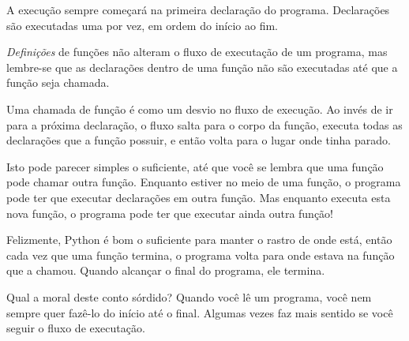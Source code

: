 A execução sempre começará na primeira declaração do programa.
Declarações são executadas uma por vez, em ordem do início ao fim.


\emph{Definições} de funções não alteram o fluxo de executação de um
programa, mas lembre-se que as declarações dentro de uma função não são
executadas até que a função seja chamada.


Uma chamada de função é como um desvio no fluxo de execução. Ao invés
de ir para a próxima declaração, o fluxo salta para o corpo da função,
executa todas as declarações que a função possuir, e então volta para
o lugar onde tinha parado.


Isto pode parecer simples o suficiente, até que você se lembra que uma
função pode chamar outra função. Enquanto estiver no meio de uma função,
o programa pode ter que executar declarações em outra função. Mas enquanto
executa esta nova função, o programa pode ter que executar ainda outra
função!


Felizmente, Python é bom o suficiente para manter o rastro de onde está,
então cada vez que uma função termina, o programa volta para onde estava na
função que a chamou. Quando alcançar o final do programa, ele termina.


Qual a moral deste conto sórdido? Quando você lê um programa, você nem
sempre quer fazê-lo do início até o final. Algumas vezes faz mais sentido
se você seguir o fluxo de executação.

